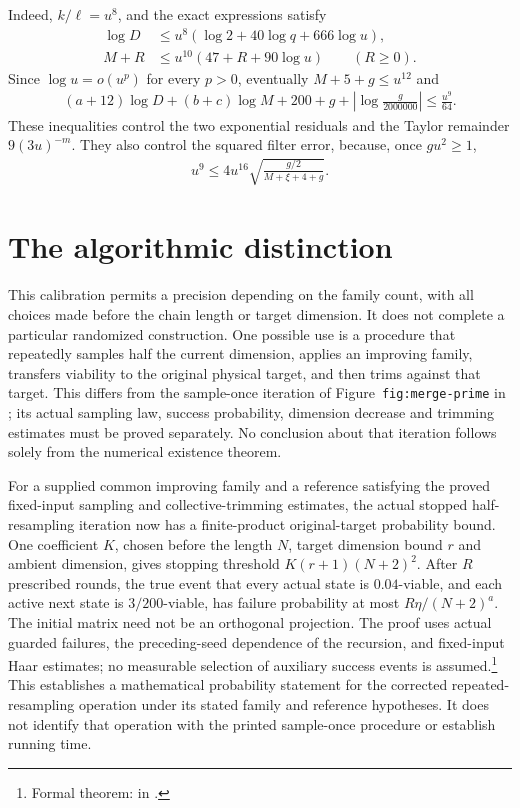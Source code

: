\documentclass{article}
\begin{document}
Indeed, $k/\ell=u^8$, and the exact expressions satisfy
\begin{align}
    \log D&\le u^8(\log2+40\log q+666\log u),\\
    M+R&\le u^{10}(47+R+90\log u)\qquad(R\ge0).
\end{align}
Since $\log u=o(u^p)$ for every $p>0$, eventually
$M+5+g\le u^{12}$ and
\begin{align}
    (a+12)\log D+(b+c)\log M
      +200+g+\left|\log\frac{g}{2000000}\right|
      \le\frac{u^9}{64}.
\end{align}
These inequalities control the two exponential residuals and the
Taylor remainder $9(3u)^{-m}$. They also control the squared filter
error, because, once $gu^2\ge1$,
\begin{align}
    u^9\le4u^{16}\sqrt{\frac{g/2}{M+\xi+4+g}}.
\end{align}

\section{The algorithmic distinction}

This calibration permits a precision depending on the family count,
with all choices made before the chain length or target dimension.
It does not complete a particular randomized construction. One possible
use is a procedure that repeatedly samples half the current dimension,
applies an improving family, transfers viability to the original
physical target, and then trims against that target. This differs from
the sample-once iteration of Figure~\texttt{fig:merge-prime}
in \cite[lines 1664--1673]{Arad2016RigorousRG}; its actual sampling law,
success probability, dimension decrease and trimming estimates must be
proved separately. No conclusion about that iteration follows solely
from the numerical existence theorem.

For a supplied common improving family and a reference satisfying the
proved fixed-input sampling and collective-trimming estimates, the actual
stopped half-resampling iteration now has a finite-product original-target
probability bound. One coefficient $K$, chosen before the length $N$,
target dimension bound $r$ and ambient dimension, gives stopping threshold
$K(r+1)(N+2)^2$. After $R$ prescribed rounds, the true event that every
actual state is $0.04$-viable, and each active next state is
$3/200$-viable, has failure probability at most $R\eta/(N+2)^a$.
The initial matrix need not be an orthogonal projection. The proof uses
actual guarded failures, the preceding-seed dependence of the recursion,
and fixed-input Haar estimates; no measurable selection of auxiliary
success events is assumed.\footnote{Formal theorem:
 in
.}
This establishes a mathematical probability statement for the corrected
repeated-resampling operation under its stated family and reference
hypotheses. It does not identify that operation with the printed
sample-once procedure or establish running time.



\end{document}
